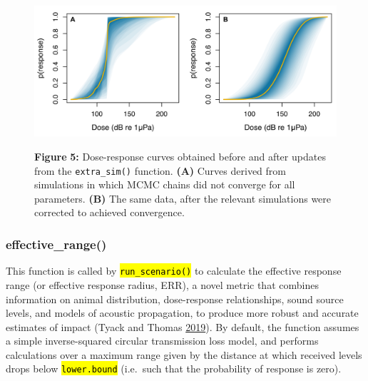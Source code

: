 \documentclass[
]{article}
\begin{document}
\begin{figure}

{\centering \includegraphics[width=0.9\linewidth]{fig/fig_convergence_comparison} 

}

\textbf{Figure }{\textbf{5:} \hypertarget{fig5}{}Dose-response curves obtained before and after updates from the \texttt{extra\_sim()} function. \textbf{(A)} Curves derived from simulations in which MCMC chains did not converge for all parameters. \textbf{(B)} The same data, after the relevant simulations were corrected to achieved convergence.}\label{fig:unnamed-chunk-12}
\end{figure}

\hypertarget{err}{}
\subsubsection{effective\_range()}

This function is called by \textcolor{codecolor}{\texttt{\hl{run\_scenario()}}} to calculate the effective response range (or effective response radius, ERR), a novel metric that combines information on animal distribution, dose-response relationships, sound source levels, and models of acoustic propagation, to produce more robust and accurate estimates of impact (Tyack and Thomas \protect\hyperlink{ref-Tyack2019}{2019}). By default, the function assumes a simple inverse-squared circular transmission loss model, and performs calculations over a maximum range given by the distance at which received levels drops below \textcolor{codecolor}{\texttt{\hl{lower.bound}}} (i.e.~such that the probability of response is zero).

\renewcommand{\arraystretch}{1.4}
\end{document}
